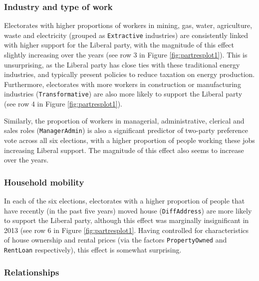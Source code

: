 \documentclass[times, doublespace]{anzsauth}
\begin{document}
\hypertarget{industry-and-type-of-work}{%
\subsubsection*{Industry and type of work}\label{industry-and-type-of-work}}

Electorates with higher proportions of workers in mining, gas, water, agriculture, waste and electricity (grouped as \texttt{Extractive} industries) are consistently linked with higher support for the Liberal party, with the magnitude of this effect slightly increasing over the years (see row 3 in Figure \ref{fig:partresplot1}). This is unsurprising, as the Liberal party has close ties with these traditional energy industries, and typically present policies to reduce taxation on energy production. Furthermore, electorates with more workers in construction or manufacturing industries (\texttt{Transformative}) are also more likely to support the Liberal party (see row 4 in Figure \ref{fig:partresplot1}).

Similarly, the proportion of workers in managerial, administrative, clerical and sales roles (\texttt{ManagerAdmin}) is also a significant predictor of two-party preference vote across all six elections, with a higher proportion of people working these jobs increasing Liberal support. The magnitude of this effect also seems to increase over the years.

\hypertarget{household-mobility}{%
\subsubsection*{Household mobility}\label{household-mobility}}

In each of the six elections, electorates with a higher proportion of people that have recently (in the past five years) moved house (\texttt{DiffAddress}) are more likely to support the Liberal party, although this effect was marginally insignificant in 2013 (see row 6 in Figure \ref{fig:partresplot1}. Having controlled for characteristics of house ownership and rental prices (via the factors \texttt{PropertyOwned} and \texttt{RentLoan} respectively), this effect is somewhat surprising.

\hypertarget{relationships}{%
\subsubsection*{Relationships}\label{relationships}}
\end{document}
